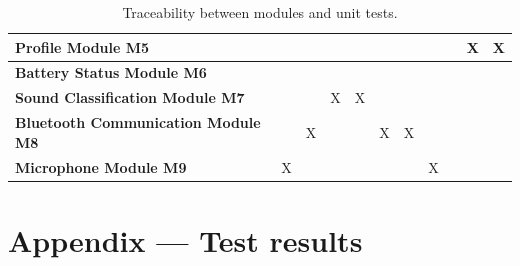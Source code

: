 \documentclass[12pt, titlepage]{article}
\begin{document}
\begin{table}[H]
\begin{tabular}{|p{2.5cm}|llllllllll|}
  \textbf{Profile Module M5}                 & \multicolumn{1}{l|}{}            & \multicolumn{1}{l|}{}            & \multicolumn{1}{l|}{}            & \multicolumn{1}{l|}{}            & \multicolumn{1}{l|}{}            & \multicolumn{1}{l|}{}            & \multicolumn{1}{l|}{}             & \multicolumn{1}{l|}{}             & \multicolumn{1}{l|}{X}            & X            \\ \hline
  \textbf{Battery Status Module M6}          & \multicolumn{1}{l|}{}            & \multicolumn{1}{l|}{}            & \multicolumn{1}{l|}{}            & \multicolumn{1}{l|}{}            & \multicolumn{1}{l|}{}            & \multicolumn{1}{l|}{}            & \multicolumn{1}{l|}{}             & \multicolumn{1}{l|}{}             & \multicolumn{1}{l|}{}             &              \\ \hline
  \textbf{Sound Classification Module M7}    & \multicolumn{1}{l|}{}            & \multicolumn{1}{l|}{}            & \multicolumn{1}{l|}{X}           & \multicolumn{1}{l|}{X}           & \multicolumn{1}{l|}{}            & \multicolumn{1}{l|}{}            & \multicolumn{1}{l|}{}             & \multicolumn{1}{l|}{}             & \multicolumn{1}{l|}{}             &              \\ \hline
  \textbf{Bluetooth Communication Module M8} & \multicolumn{1}{l|}{}            & \multicolumn{1}{l|}{X}           & \multicolumn{1}{l|}{}            & \multicolumn{1}{l|}{}            & \multicolumn{1}{l|}{X}           & \multicolumn{1}{l|}{X}           & \multicolumn{1}{l|}{}             & \multicolumn{1}{l|}{}             & \multicolumn{1}{l|}{}             &              \\ \hline
  \textbf{Microphone Module M9}              & \multicolumn{1}{l|}{X}           & \multicolumn{1}{l|}{}            & \multicolumn{1}{l|}{}            & \multicolumn{1}{l|}{}            & \multicolumn{1}{l|}{}            & \multicolumn{1}{l|}{}            & \multicolumn{1}{l|}{X}            & \multicolumn{1}{l|}{}             & \multicolumn{1}{l|}{}             &              \\ \hline
  \end{tabular}
  \caption{Traceability between modules and unit tests.}
  \label{tab:my-table}
\end{table}

\newpage{}
\section*{Appendix --- Test results}
\end{document}
